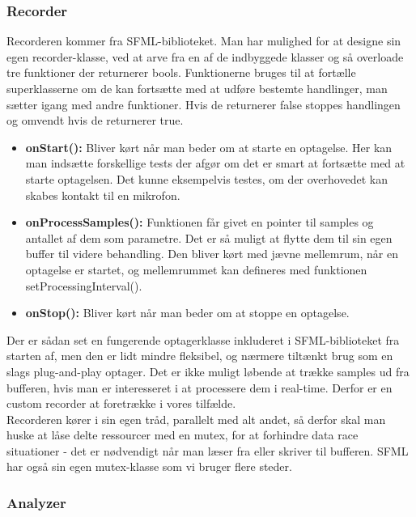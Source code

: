 \subsubsection{Recorder}

Recorderen kommer fra SFML-biblioteket. Man har mulighed for at designe sin egen recorder-klasse, ved at arve fra en af de indbyggede klasser og så overloade tre funktioner der returnerer bools. Funktionerne bruges til at fortælle superklasserne om de kan fortsætte med at udføre bestemte handlinger, man sætter igang med andre funktioner. Hvis de returnerer false stoppes handlingen og omvendt hvis de returnerer true.

\begin{itemize}

\item \textbf{onStart():} Bliver kørt når man beder om at starte en optagelse. Her kan man indsætte forskellige tests der afgør om det er smart at fortsætte med at starte optagelsen. Det kunne eksempelvis testes, om der overhovedet kan skabes kontakt til en mikrofon.

\item \textbf{onProcessSamples():} Funktionen får givet en pointer til samples og antallet af dem som parametre. Det er så muligt at flytte dem til sin egen buffer til videre behandling. Den bliver kørt med jævne mellemrum, når en optagelse er startet, og mellemrummet kan defineres med funktionen setProcessingInterval(). 

\item \textbf{onStop():} Bliver kørt når man beder om at stoppe en optagelse.

\end{itemize}

Der er sådan set en fungerende optagerklasse inkluderet i SFML-biblioteket fra starten af, men den er lidt mindre fleksibel, og nærmere tiltænkt brug som en slags plug-and-play optager. Det er ikke muligt løbende at trække samples ud fra bufferen, hvis man er interesseret i at processere dem i real-time. Derfor er en custom recorder at foretrække i vores tilfælde. \\
Recorderen kører i sin egen tråd, parallelt med alt andet, så derfor skal man huske at låse delte ressourcer med en mutex, for at forhindre data race situationer - det er nødvendigt når man læser fra eller skriver til bufferen. SFML har også sin egen mutex-klasse som vi bruger flere steder.

\subsubsection{Analyzer}

